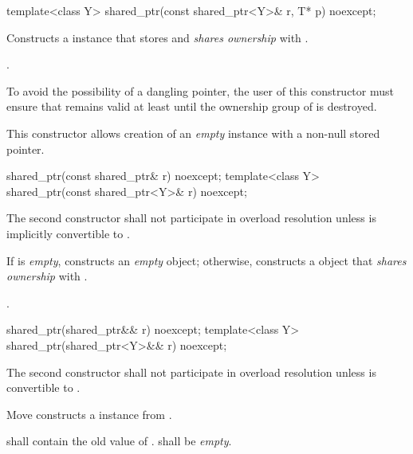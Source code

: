 %
\begin{itemdecl}
template<class Y> shared_ptr(const shared_ptr<Y>& r, T* p) noexcept;
\end{itemdecl}

\begin{itemdescr}
\pnum
\effects Constructs a  instance that
stores  and \textit{shares ownership} with .

\pnum
\postconditions {}.

\pnum
\enternote To avoid the possibility of a dangling pointer, the
user of this constructor must ensure that  remains valid at
least until the ownership group of  is destroyed. \exitnote

\pnum
\enternote This constructor allows creation of an \textit{empty}
 instance with a non-null stored pointer. \exitnote
\end{itemdescr}

%
\begin{itemdecl}
shared_ptr(const shared_ptr& r) noexcept;
template<class Y> shared_ptr(const shared_ptr<Y>& r) noexcept;
\end{itemdecl}

\begin{itemdescr}
\pnum\remark
The second constructor shall not participate in overload resolution unless
 is implicitly convertible to .

\pnum\effects  If  is \textit{empty}, constructs
an \textit{empty}  object; otherwise, constructs
a  object that \textit{shares ownership} with .

\pnum\postconditions  {}.
\end{itemdescr}

%
\begin{itemdecl}
shared_ptr(shared_ptr&& r) noexcept;
template<class Y> shared_ptr(shared_ptr<Y>&& r) noexcept;
\end{itemdecl}

\begin{itemdescr}
\pnum
\remark The second constructor shall not participate in overload resolution unless
 is convertible to .

\pnum
\effects Move constructs a  instance from .

\pnum
\postconditions {} shall contain the old value of
.  shall be \textit{empty}. 
\end{itemdescr}

